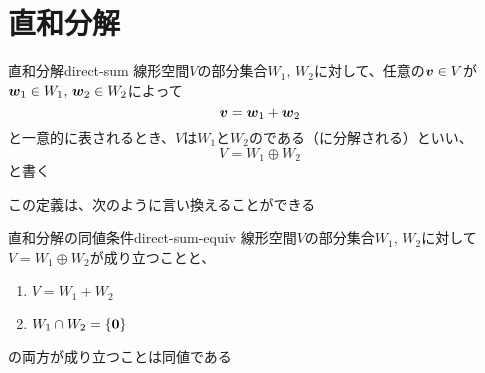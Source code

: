 \documentclass[../../../topic_linear-algebra]{subfiles}
\begin{document}
\sectionline
\section{直和分解}

\begin{definition}{直和分解}{direct-sum}
  線形空間$V$の部分集合$W_1,\,W_2$に対して、任意の$\vb*{v} \in V$が$\vb*{w}_1 \in W_1, \, \vb*{w}_2 \in W_2$によって
  \begin{equation*}
    \vb*{v} = \vb*{w}_1 + \vb*{w}_2
  \end{equation*}
  と一意的に表されるとき、$V$は$W_1$と$W_2$のである（に分解される）といい、
  \begin{equation*}
    V = W_1 \oplus W_2
  \end{equation*}
  と書く
\end{definition}

この定義は、次のように言い換えることができる

\begin{theorem}{直和分解の同値条件}{direct-sum-equiv}
  線形空間$V$の部分集合$W_1,\,W_2$に対して$V=W_1 \oplus W_2$が成り立つことと、
  \begin{enumerate}[label=\romanlabel]
    \item $V = W_1 + W_2$
    \item $W_1 \cap W_2 = \{ \vb*{0} \}$
  \end{enumerate}
  の両方が成り立つことは同値である
\end{theorem}
\end{document}
